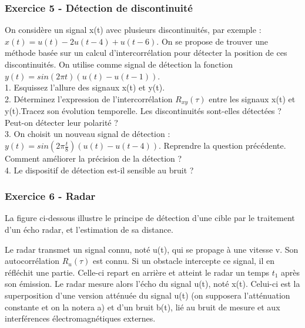 	\subsubsection{Exercice 5 - Détection de discontinuité}
	
	On considère un signal x(t) avec plusieurs discontinuités, par exemple : $x(t)=u(t)-2u(t-4)+u(t-6)$. On se propose de trouver une méthode basée sur un calcul d'intercorrélation pour détecter la position de ces discontinuités. On utilise comme signal de détection la fonction $y(t)=sin(2\pi t)(u(t)-u(t-1))$.\\
	
	1. Esquissez l'allure des signaux x(t) et y(t).\\
	
	2. Déterminez l'expression de l'intercorrélation $R_{xy}(\tau)$ entre les signaux x(t) et y(t).Tracez son évolution temporelle. Les discontinuités sont-elles détectées ? Peut-on détecter leur polarité ?\\
	
	3. On choisit un nouveau signal de détection : $y(t)=sin(2\pi \frac{t}{8})(u(t)-u(t-4))$. Reprendre la question précédente. Comment améliorer la précision de la détection ? \\
	
	4. Le dispositif de détection est-il sensible au bruit ?\\
	
	\vspace{1\baselineskip}	
	
	\subsubsection{Exercice 6 - Radar}
	
	La figure ci-dessous illustre le principe de détection d'une cible par le traitement d'un écho radar, et l'estimation de sa distance.
	
	Le radar transmet un signal connu, noté u(t), qui se propage à une vitesse v. Son autocorrélation $R_{u}(\tau)$ est connu. Si un obstacle intercepte ce signal, il en réfléchit une partie. Celle-ci repart en arrière et atteint le radar un temps $t_{1}$ après son émission. Le radar mesure alors l'écho du signal u(t), noté x(t). Celui-ci est la superposition d'une version atténuée du signal u(t) (on supposera l'atténuation constante et on la notera a) et d'un bruit b(t), lié au bruit de mesure et aux interférences électromagnétiques externes.\\
	

